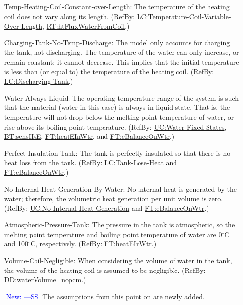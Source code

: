 \documentclass[12pt]{article}
\newcommand{\authornote}[3]{\textcolor{#1}{[#3 ---#2]}}
\newcommand{\authornote}[3]{}
\newcommand{\wss}[1]{\authornote{blue}{SS}{#1}}
\begin{document}
\begin{itemize}
\item[Temp-Heating-Coil-Constant-over-Length:\phantomsection\label{assumpTHCCoL}]{The temperature of the heating coil does not vary along its length. (RefBy: \hyperref[likeChgTCVOL]{LC:Temperature-Coil-Variable-Over-Length}, \hyperref[RT:htFluxWaterFromCoil]{RT:htFluxWaterFromCoil}.)}
\item[Charging-Tank-No-Temp-Discharge:\phantomsection\label{assumpCTNTD}]{The model only accounts for charging the tank, not discharging. The temperature of the water can only increase, or remain constant; it cannot decrease. This implies that the initial temperature is less than (or equal to) the temperature of the heating coil. (RefBy: \hyperref[likeChgDT]{LC:Discharging-Tank}.)}
\item[Water-Always-Liquid:\phantomsection\label{assumpWAL}]{The operating temperature range of the system is such that the material (water in this case) is always in liquid state. That is, the temperature will not drop below the melting point temperature of water, or rise above its boiling point temperature. (RefBy: \hyperref[unlikeChgWFS]{UC:Water-Fixed-States}, \hyperref[BT:sensHtE]{BT:sensHtE}, \hyperref[FT:heatEInWtr]{FT:heatEInWtr}, and \hyperref[FT:eBalanceOnWtr]{FT:eBalanceOnWtr}.)}
\item[Perfect-Insulation-Tank:\phantomsection\label{assumpPIT}]{The tank is perfectly insulated so that there is no heat loss from the tank. (RefBy: \hyperref[likeChgTLH]{LC:Tank-Lose-Heat} and \hyperref[FT:eBalanceOnWtr]{FT:eBalanceOnWtr}.)}
\item[No-Internal-Heat-Generation-By-Water:\phantomsection\label{assumpNIHGBW}]{No internal heat is generated by the water; therefore, the volumetric heat generation per unit volume is zero. (RefBy: \hyperref[unlikeChgNIHG]{UC:No-Internal-Heat-Generation} and \hyperref[FT:eBalanceOnWtr]{FT:eBalanceOnWtr}.)}
\item[Atmospheric-Pressure-Tank:\phantomsection\label{assumpAPT}]{The pressure in the tank is atmospheric, so the melting point temperature and boiling point temperature of water are 0${{}^{\circ}\text{C}}$ and 100${{}^{\circ}\text{C}}$, respectively. (RefBy: \hyperref[FT:heatEInWtr]{FT:heatEInWtr}.)}
\item[Volume-Coil-Negligible:\phantomsection\label{assumpVCN}]{When considering the volume of water in the tank, the volume of the heating coil is assumed to be negligible. (RefBy: \hyperref[DD:waterVolume.nopcm]{DD:waterVolume\_nopcm}.)}

\item[\wss{New:}] The assumptions from this point on are newly added.
 

\end{itemize}
\end{document}
